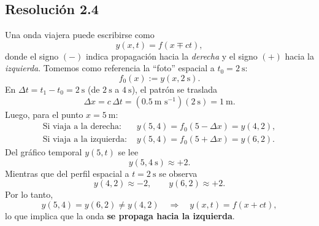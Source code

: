 \documentclass[
  11pt,
  letterpaper,
   addpoints,
  ]{exam}
\begin{document}
\begin{questions}
\begin{solution}
\subsection*{Resolución 2.4}

Una onda viajera puede escribirse como
\begin{equation}
y(x,t)=f(x\mp ct),
\end{equation}
donde el signo \((-)\) indica propagación hacia la \emph{derecha} y el signo \((+)\) hacia la
\emph{izquierda}. Tomemos como referencia la “foto” espacial a \(t_0=2~\text{s}\):
\begin{equation}
f_0(x):=y(x,2~\text{s}).
\end{equation}
En \(\Delta t=t_1-t_0=2~\text{s}\) (de \(2~\text{s}\) a \(4~\text{s}\)), el patrón se traslada
\begin{equation}
\Delta x = c\,\Delta t = (0.5~\text{m s}^{-1})(2~\text{s}) = 1~\text{m}.
\end{equation}
Luego, para el punto \(x=5~\text{m}\):
\begin{align}
\text{Si viaja a la derecha: } & y(5,4)=f_0(5-\Delta x)=y(4,2),\\
\text{Si viaja a la izquierda: } & y(5,4)=f_0(5+\Delta x)=y(6,2).
\end{align}
Del gráfico temporal \(y(5,t)\) se lee
\begin{equation}
y(5,4~\text{s})\approx +2.
\end{equation}
Mientras que del perfil espacial a \(t=2~\text{s}\) se observa
\begin{equation}
y(4,2)\approx -2, \qquad y(6,2)\approx +2.
\end{equation}
Por lo tanto,
\begin{equation}
y(5,4)=y(6,2)\neq y(4,2)\quad\Rightarrow\quad y(x,t)=f(x+ct),
\end{equation}
lo que implica que la onda \textbf{se propaga hacia la izquierda}.

\end{solution}


\end{questions}
\end{document}
